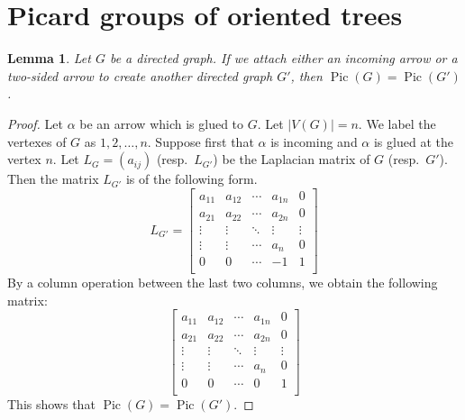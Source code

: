 \documentclass[11pt,reqno]{amsart}
\DeclareMathOperator{\Pic}{Pic}
\theoremstyle{definition}
\theoremstyle{plain}
\newtheorem{lem}[mydef]{Lemma}
\begin{document}
\section{Picard groups of oriented trees}

\begin{lem}\label{proposition: gluing an arrow proposition}
Let $G$ be a directed graph. If we attach either an incoming arrow or a two-sided arrow to create another directed graph $G'$, then $\Pic(G)=\Pic(G')$.
\end{lem}
\begin{proof}
Let $\alpha$ be an arrow which is glued to $G$. Let $|V(G)|=n$. We label the vertexes of $G$ as $1,2,\dots,n$. Suppose first that $\alpha$ is incoming and $\alpha$ is glued at the vertex $n$. Let $L_G=(a_{ij})$ (resp.~$L_{G'}$) be the Laplacian matrix of $G$ (resp.~$G'$). 
Then the matrix $L_{G'}$ is of the following form.
\begin{equation}
L_{G'}=\left[\begin{array}{ccc|c|c}
a_{11}&a_{12}&\cdots &a_{1n}&0\\
a_{21}&a_{22}&\cdots &a_{2n}&0\\
\vdots & \vdots &\ddots & \vdots & \vdots \\ \hline
\vdots & \vdots & \cdots&a_n & 0\\ \hline
0&0&\cdots &-1&1\\
\end{array}\right]
\end{equation}
		By a column operation between the last two columns, we obtain the following matrix:
		\begin{equation}\label{eq: arrow adding matrix}
			\left[\begin{array}{ccc|c|c}
				a_{11}&a_{12}&\cdots &a_{1n}&0\\
				a_{21}&a_{22}&\cdots &a_{2n}&0\\
				\vdots & \vdots &\ddots & \vdots & \vdots \\ \hline
				\vdots & \vdots & \cdots&a_n & 0\\ \hline
				0&0&\cdots &0&1\\
			\end{array}\right]
		\end{equation}
		This shows that $\Pic(G)=\Pic(G')$.


\end{proof}
\end{document}
